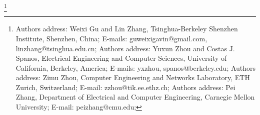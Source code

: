 \documentclass[acmlarge]{acmart}
\begin{document}
%

%
%


\thanks{
Authors address: Weixi Gu and Lin Zhang, Tsinghua-Berkeley Shenzhen Institute, Shenzhen, China;
E-mails: guweixigavin@gmail.com, linzhang@tsinghua.edu.cn;
Authors address: Yuxun Zhou and Costas J. Spanos, Electrical Engineering and Computer Sciences, University of California, Berkeley, America;
E-mails: {yxzhou, spanos}@berkeley.edu;
Authors address: Zimu Zhou, Computer Engineering and Networks Laboratory, ETH Zurich, Switzerland;
E-mail: zzhou@tik.ee.ethz.ch;
Authors address: Pei Zhang, Department of Electrical and Computer Engineering, Carnegie Mellon University;
E-mail: peizhang@cmu.edu;
}

\maketitle




%




%




\end{document}
